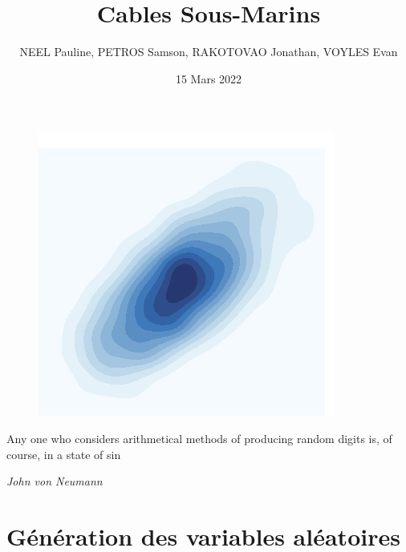 \documentclass[10pt]{article} %
\title{Cables Sous-Marins}
\author{NEEL Pauline, PETROS Samson, RAKOTOVAO Jonathan, VOYLES Evan}
\date{15 Mars 2022}
\begin{document}
\begin{titlepage}

\maketitle

\begin{figure}[h!]
    \centering
    \includegraphics{media/plot.png}
\end{figure}

\vspace{3cm}




\epigraph{Any one who considers arithmetical methods of producing random digits is, of course, in a state of sin}
 {\textit{John von Neumann}}

\newpage

\end{titlepage}

\pagestyle{fancy}

\section{Génération des variables aléatoires}
\end{document}

